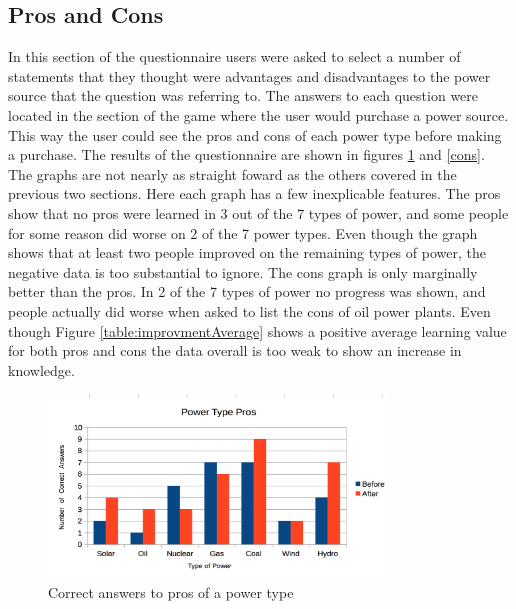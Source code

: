 \documentclass[msc,oneside]{ubcthesis}%
\begin{document}
\subsection{Pros and Cons}
In this section of the questionnaire users were asked to select a number of statements that they thought were advantages and disadvantages to the power source that the question was referring to. The answers to each question were located in the section of the game where the user would purchase a power source. This way the user could see the pros and cons of each power type before making a purchase. The results of the questionnaire are shown in figures \ref{pros} and \ref{cons}. The graphs are not nearly as straight foward as the others covered in the previous two sections. Here each graph has a few inexplicable features. The pros show that no pros were learned in 3 out of the 7 types of power, and some people for some reason did worse on 2 of the 7 power types. Even though the graph shows that at least two people improved on the remaining types of power, the negative data is too substantial to ignore. The cons graph is only marginally better than the pros. In 2 of the 7 types of power no progress was shown, and people actually did worse when asked to list the cons of oil power plants. Even though Figure \ref{table:improvmentAverage} shows a positive average learning value for both pros and cons the data overall is too weak to show an increase in knowledge.

\begin{figure}[hbt]
  \begin{center}
    \includegraphics[width=0.8\textwidth]{survey_pics/post_and_pre/pros}
    \caption[Correct pros ]{Correct answers to pros of a power type}\label{pros}
  \end{center}
\end{figure}
\end{document}
